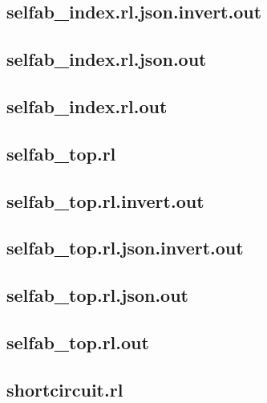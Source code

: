 \subsection{selfab\_index.rl.json.invert.out}
\label{app:selfab_index_rl.json.invert.out}

\subsection{selfab\_index.rl.json.out}
\label{app:selfab_index_rl.json.out}

\subsection{selfab\_index.rl.out}
\label{app:selfab_index_rl.out}

\subsection{selfab\_top.rl}
\label{app:selfab_top_rl}

\subsection{selfab\_top.rl.invert.out}
\label{app:selfab_top_rl.invert.out}

\subsection{selfab\_top.rl.json.invert.out}
\label{app:selfab_top_rl.json.invert.out}

\subsection{selfab\_top.rl.json.out}
\label{app:selfab_top_rl.json.out}

\subsection{selfab\_top.rl.out}
\label{app:selfab_top_rl.out}

\subsection{shortcircuit.rl}
\label{app:shortcircuit_rl}

